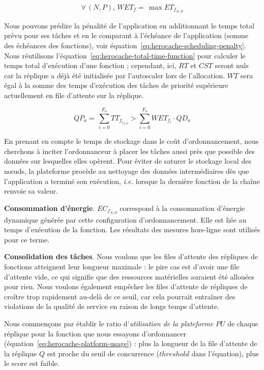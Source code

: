 \begin{equation}
    \forall \, (N, P), \, WET_{f} = \, \max ET_{f_{N, P}}
\label{eq:herocache-task-wet}
\end{equation}

Nous pouvons prédire la pénalité de l'application en additionnant le temps total prévu pour ses tâches et en le comparant à l'échéance de l'application (somme des échéances des fonctions), voir équation~\ref{eq:herocache-scheduling-penalty}. Nous réutilisons l'équation~\ref{eq:herocache-total-time-function} pour calculer le temps total d'exécution d'une fonction ; cependant, ici, $RT$ et $CST$ seront nuls car la réplique a déjà été initialisée par l'autoscaler lors de l'allocation. $WT$ sera égal à la somme des temps d'exécution des tâches de priorité supérieure actuellement en file d'attente sur la réplique.

\begin{equation}
   QP_{a} = \, \sum_{i = 0}^{F_a} TT_{{f}_{{i}_{N, P}}} > \sum_{i = 0}^{F_a} WET_{f_{i}} \cdot QD_{a}
\label{eq:herocache-scheduling-penalty}
\end{equation}

En prenant en compte le temps de stockage dans le coût d'ordonnancement, nous cherchons à inciter l'ordonnanceur à placer les tâches aussi près que possible des données sur lesquelles elles opèrent. Pour éviter de saturer le stockage local des nœuds, la plateforme procède au nettoyage des données intermédiaires dès que l'application a terminé son exécution, \textit{i.e.} lorsque la dernière fonction de la chaîne renvoie sa valeur.

\textbf{Consommation d'énergie}. ${EC}_{{f}_{N, P}}$ correspond à la consommation d'énergie dynamique générée par cette configuration d'ordonnancement. Elle est liée au temps d'exécution de la fonction. Les résultats des mesures hors-ligne sont utilisés pour ce terme.

\textbf{Consolidation des tâches}. Nous voulons que les files d'attente des répliques de fonctions atteignent leur longueur maximale : le pire cas est d'avoir une file d'attente vide, ce qui signifie que des ressources matérielles auraient été allouées pour rien. Nous voulons également empêcher les files d'attente de répliques de croître trop rapidement au-delà de ce seuil, car cela pourrait entraîner des violations de la qualité de service en raison de longs temps d'attente.

Nous commençons par établir le ratio d'\textit{utilisation de la plateforme} $PU$ de chaque réplique pour la fonction que nous essayons d'ordonnancer (équation~\ref{eq:herocache-platform-usage}) : plus la longueur de la file d'attente de la réplique $Q$ est proche du seuil de concurrence ($threshold$ dans l'équation), plus le score est faible. 

